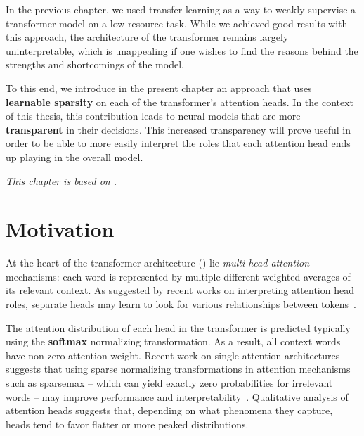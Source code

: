 \label{chap:adaptsparse}

\cleardoublepage
\doublespacing

\noindent In the previous chapter, we used transfer learning as a way
to weakly supervise a transformer model on a low-resource task.
While we achieved good results with this approach, the
architecture of the transformer remains largely uninterpretable,
which is unappealing if one wishes to find the
reasons behind the strengths and shortcomings of the model.

To this end, we introduce in the present chapter an approach that
uses \textbf{learnable sparsity} on each of the transformer's
attention heads. In the context of this thesis, this contribution
leads to neural models that are more \textbf{transparent} in their
decisions. This increased transparency will prove useful in order to
be able to more easily interpret the roles that each attention head
ends up playing in the overall model.

\textit{This chapter is based on \citet*{correia2019adaptively}.}

\section{Motivation}

\noindent At the heart of the transformer architecture
() lie \emph{multi-head attention}
mechanisms: each word is represented by multiple different weighted
averages of its relevant context. As suggested by recent works on
interpreting attention head roles, separate heads may learn
to look for various relationships between
tokens~\citep{tang2018why,raganato2018analysis,
    marecek-rosa-2018-extracting,bert-rediscovers,specialized}.

The attention distribution of each head in the transformer is
predicted typically using the \textbf{softmax} normalizing transformation.
As a result, all context words have non-zero attention weight. Recent
work on single attention architectures suggests that using sparse
normalizing transformations in attention mechanisms such as sparsemax --
which can yield exactly zero probabilities for irrelevant words --
may improve performance and
interpretability~\citep{malaviya2018sparse,deng2018latent,entmax}.
Qualitative analysis of attention heads
\citep[Figure~5]{vaswani2017attention} suggests that, depending on
what phenomena they capture, heads tend to favor flatter or more
peaked distributions.

